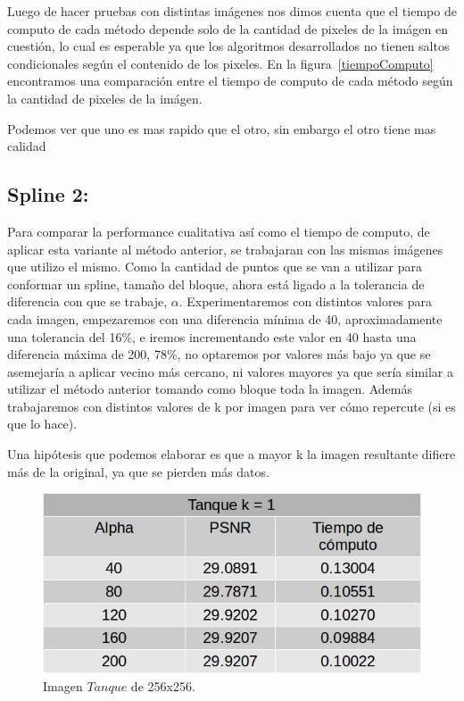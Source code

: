 \documentclass[a4paper]{article}
\begin{document}
Luego de hacer pruebas con distintas imágenes nos dimos cuenta que el tiempo de computo de cada método depende solo de la cantidad de pixeles de la imágen en cuestión, lo cual es esperable ya que los algoritmos desarrollados no tienen saltos condicionales según el contenido de los pixeles. En la figura~\ref{tiempoComputo} encontramos una comparación entre el tiempo de computo de cada método según la cantidad de pixeles de la imágen.

\label{tiempoComputo}

Podemos ver que uno es mas rapido que el otro, sin embargo el otro tiene mas calidad

\subsection{Spline 2:}

Para comparar la performance cualitativa así como el tiempo de computo, de aplicar esta variante al método anterior, se trabajaran con las mismas imágenes que utilizo el mismo. Como la cantidad de puntos que se van a utilizar para conformar un spline, tamaño del bloque, ahora está ligado a la tolerancia de diferencia con que se trabaje, $\alpha$. Experimentaremos con distintos valores para cada imagen, empezaremos con una diferencia mínima de 40, aproximadamente una tolerancia del 16\%, e iremos incrementando este valor en 40 hasta una diferencia máxima de 200, 78\%, no optaremos por valores más bajo ya que se asemejaría a aplicar vecino más cercano, ni valores mayores ya que sería similar a utilizar el método anterior tomando como bloque toda la imagen. Además trabajaremos con distintos valores de k por imagen para ver cómo repercute (si es que lo hace).   

Una hipótesis que podemos elaborar es que a mayor k la imagen resultante difiere más de la original, ya que se pierden más datos.    



\begin{figure}[H]
    \centering
    \includegraphics[scale=0.4]{imagenes/tanque1.jpg}
    \caption{Imagen $Tanque$ de 256x256.}
	\label{tanquee}
    \end{figure}
	
\end{document}
